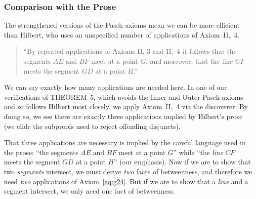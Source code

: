 \subsubsection{Comparison with the Prose}
The strengthened versions of the Pasch axioms mean we can be more efficient than Hilbert, who uses an unspecified number of applications of Axiom~II,~4.

\begin{quote}
``By repeated applications of Axioms II, 3 and II,~4 it follows that the segments $AE$ and $BF$ meet at a point $G$, and moreover, that the line $CF$ meets the segment $GD$ at a point $H$.''
\end{quote}

We can say exactly how many applications are needed here. In one of our verifications of THEOREM~5, which avoids the Inner and Outer Pasch axioms and so follows Hilbert most closely, we apply Axiom~II,~4 via the  discoverer. By doing so, we see there are exactly three applications implied by Hilbert's prose (we elide the subproofs used to reject offending disjuncts).

\linebreak

That three applications are necessary is implied by the careful language used in the prose: ``the segments $AE$ and $BF$ meet at a point $G$'' while ``the \emph{line} $CF$ meets the segment $GD$ at a point $H$'' (our emphasis). Now if we are to show that two \emph{segments} intersect, we must derive \emph{two} facts of betweenness, and therefore we need \emph{two} applications of Axiom~\ref{eq:g24}. But if we are to show that a \emph{line} and a segment intersect, we only need one fact of betweenness. 


